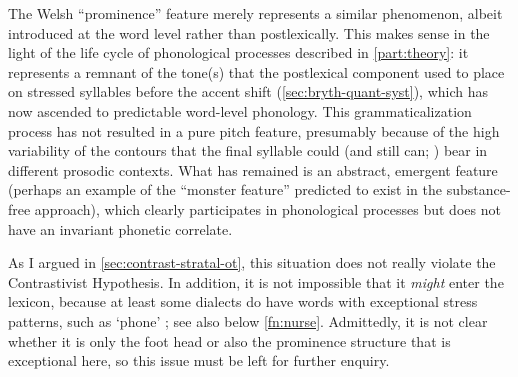 The Welsh \enquote{prominence} feature merely represents a similar phenomenon, albeit introduced at the word level rather than postlexically. This makes sense in the light of the life cycle of phonological processes described in \cref{part:theory}: it represents a remnant of the tone(s) that the postlexical component used to place on stressed syllables before the accent shift (\cref{sec:bryth-quant-syst}), which has now ascended to predictable word\hyp level phonology. This grammaticalization process has not resulted in a pure pitch feature, presumably because of the high variability of the contours that the final syllable could (and still can; \citealp{thomas67:_welsh,pilch75:_advan_welsh,williams85:_pitch_welsh}) bear in different prosodic contexts. What has remained is an abstract, emergent feature (perhaps an example of the \enquote{monster feature} predicted to exist in the substance\hyp free approach), which clearly participates in phonological processes but does not have an invariant phonetic correlate.

As I argued in \cref{sec:contrast-stratal-ot}, this situation does not really violate the Contrastivist Hypothesis. In addition, it is not impossible that it \emph{might} enter the lexicon, because at least some dialects do have words with exceptional stress patterns, such as \ipa{[ˈtelefon]} `phone' \citep{jones}; see also below \cref{fn:nurse}. Admittedly, it is not clear whether it is only the foot head or also the prominence structure that is exceptional here, so this issue must be left for further enquiry.

